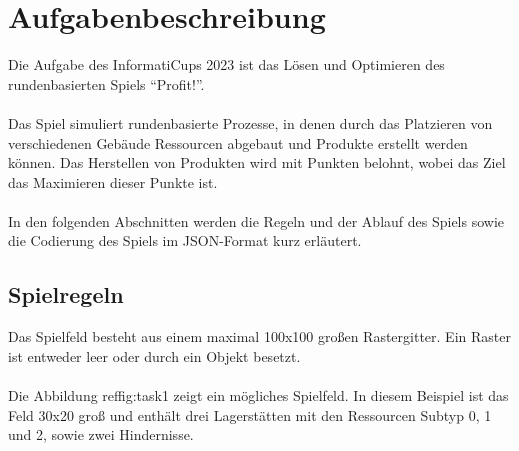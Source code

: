 \section{Aufgabenbeschreibung}\label{cap:aufgabenbeschriebung}
Die Aufgabe des InformatiCups 2023 ist das Lösen und Optimieren des rundenbasierten Spiels “Profit!”. 
\\\\
Das Spiel simuliert rundenbasierte Prozesse, in denen durch das Platzieren von verschiedenen Gebäude Ressourcen abgebaut und Produkte erstellt werden können. Das Herstellen von Produkten wird mit Punkten belohnt, wobei das Ziel das Maximieren dieser Punkte ist.
\\\\
In den folgenden Abschnitten werden die Regeln und der Ablauf des Spiels sowie die Codierung des Spiels im JSON-Format kurz erläutert.

\subsection{Spielregeln}
Das Spielfeld besteht aus einem maximal 100x100 großen Rastergitter. Ein Raster ist entweder leer oder durch ein Objekt besetzt.
\\\\
Die Abbildung ref{fig:task1} zeigt ein mögliches Spielfeld. In diesem Beispiel ist das Feld 30x20 groß und enthält drei Lagerstätten mit den Ressourcen Subtyp 0, 1 und 2, sowie zwei Hindernisse.

